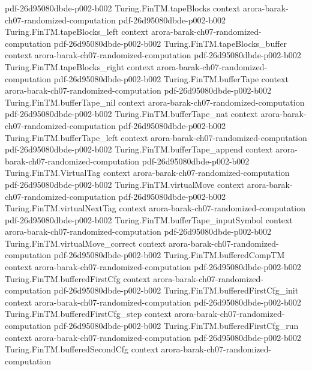 \begin{theorem}
  {pdf-26d95080dbde-p002-b002}
\proofstep
  {Turing.FinTM.tapeBlocks}
  {context}
  {arora-barak-ch07-randomized-computation}
  {pdf-26d95080dbde-p002-b002}
\proofstep
  {Turing.FinTM.tapeBlocks_left}
  {context}
  {arora-barak-ch07-randomized-computation}
  {pdf-26d95080dbde-p002-b002}
\proofstep
  {Turing.FinTM.tapeBlocks_buffer}
  {context}
  {arora-barak-ch07-randomized-computation}
  {pdf-26d95080dbde-p002-b002}
\proofstep
  {Turing.FinTM.tapeBlocks_right}
  {context}
  {arora-barak-ch07-randomized-computation}
  {pdf-26d95080dbde-p002-b002}
\proofstep
  {Turing.FinTM.bufferTape}
  {context}
  {arora-barak-ch07-randomized-computation}
  {pdf-26d95080dbde-p002-b002}
\proofstep
  {Turing.FinTM.bufferTape_nil}
  {context}
  {arora-barak-ch07-randomized-computation}
  {pdf-26d95080dbde-p002-b002}
\proofstep
  {Turing.FinTM.bufferTape_nat}
  {context}
  {arora-barak-ch07-randomized-computation}
  {pdf-26d95080dbde-p002-b002}
\proofstep
  {Turing.FinTM.bufferTape_left}
  {context}
  {arora-barak-ch07-randomized-computation}
  {pdf-26d95080dbde-p002-b002}
\proofstep
  {Turing.FinTM.bufferTape_append}
  {context}
  {arora-barak-ch07-randomized-computation}
  {pdf-26d95080dbde-p002-b002}
\proofstep
  {Turing.FinTM.VirtualTag}
  {context}
  {arora-barak-ch07-randomized-computation}
  {pdf-26d95080dbde-p002-b002}
\proofstep
  {Turing.FinTM.virtualMove}
  {context}
  {arora-barak-ch07-randomized-computation}
  {pdf-26d95080dbde-p002-b002}
\proofstep
  {Turing.FinTM.virtualNextTag}
  {context}
  {arora-barak-ch07-randomized-computation}
  {pdf-26d95080dbde-p002-b002}
\proofstep
  {Turing.FinTM.bufferTape_inputSymbol}
  {context}
  {arora-barak-ch07-randomized-computation}
  {pdf-26d95080dbde-p002-b002}
\proofstep
  {Turing.FinTM.virtualMove_correct}
  {context}
  {arora-barak-ch07-randomized-computation}
  {pdf-26d95080dbde-p002-b002}
\proofstep
  {Turing.FinTM.bufferedCompTM}
  {context}
  {arora-barak-ch07-randomized-computation}
  {pdf-26d95080dbde-p002-b002}
\proofstep
  {Turing.FinTM.bufferedFirstCfg}
  {context}
  {arora-barak-ch07-randomized-computation}
  {pdf-26d95080dbde-p002-b002}
\proofstep
  {Turing.FinTM.bufferedFirstCfg_init}
  {context}
  {arora-barak-ch07-randomized-computation}
  {pdf-26d95080dbde-p002-b002}
\proofstep
  {Turing.FinTM.bufferedFirstCfg_step}
  {context}
  {arora-barak-ch07-randomized-computation}
  {pdf-26d95080dbde-p002-b002}
\proofstep
  {Turing.FinTM.bufferedFirstCfg_run}
  {context}
  {arora-barak-ch07-randomized-computation}
  {pdf-26d95080dbde-p002-b002}
\proofstep
  {Turing.FinTM.bufferedSecondCfg}
  {context}
  {arora-barak-ch07-randomized-computation}

\end{theorem}
